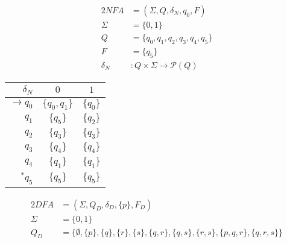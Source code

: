 \documentclass[docid=TP03]{tcom_TP}
\begin{document}
{\begin{center}
\end{center}
\begin{center}
	\begin{minipage}[c]{0.30\textwidth}
		\begin{alignat*}{2}
			NFA       &= (\Sigma, Q, \delta_N, q_0, F)\\
			\Sigma    &= \{0,1\}\\
			Q         &= \{q_0,q_1,q_2,q_3,q_4,q_5\}\\
			F         &= \{q_5\}\\
			\delta_N &\colon Q \times \Sigma \rightarrow \mathscr{P}(Q)
		\end{alignat*}
	\end{minipage}
	\begin{minipage}[c]{0.25\textwidth}
		\begin{center}
		\begin{tabular}{ r | c c }
 			$\delta_N$ & $0$ & $1$ \\ \hline
 			$\rightarrow q_0$ & $\{q_0,q_1\}$ & $\{q_0\}$ \\  
 			$            q_1$ & $\{q_5    \}$ & $\{q_2\}$ \\
 			$            q_2$ & $\{q_3    \}$ & $\{q_3\}$ \\
 			$            q_3$ & $\{q_4    \}$ & $\{q_4\}$ \\
 			$            q_4$ & $\{q_1    \}$ & $\{q_1\}$ \\
 			$      ^* q_5$ & $\{q_5    \}$ & $\{q_5\}$ 
		\end{tabular}
		\end{center}
	\end{minipage}
\end{center}
\pagebreak
{}
\label{subsec:03_02}
\begin{alignat*}{2}
	DFA       &= (\Sigma, Q_D, \delta_D, \{p\}, F_D)\\
	\Sigma    &= \{0,1\}\\
	Q_D       &= \{\emptyset,\{p\},\{q\},\{r\},\{s\},\{q,r\},\{q,s\},\{r,s\},\{p,q,r\},\{q,r,s\}\}\\

\end{alignat*}}
\end{document}
